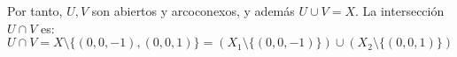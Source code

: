 \begin{ejercicio}
\begin{enumerate}[label=\alph*)]
\begin{description}

                Por tanto, $U,V$ son abiertos y arcoconexos, y además $U\cup V = X$. La intersección $U\cap V$ es:
                \begin{equation*}
                    U\cap V = X\setminus \{(0,0,-1),(0,0,1)\} = (X_1\setminus \{(0,0,-1)\}) \cup (X_2\setminus \{(0,0,1)\})
                \end{equation*}


                \begin{figure}[ht]
                    \centering
\end{figure}
\end{description}
\end{enumerate}
\end{ejercicio}
